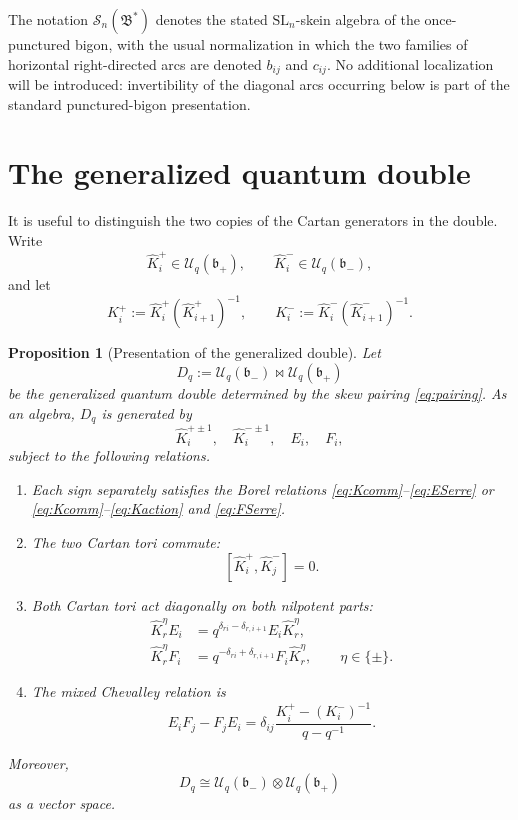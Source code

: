 \documentclass[11pt]{amsart}
\numberwithin{equation}{section}
\newtheorem{proposition}[equation]{Proposition}
\theoremstyle{definition}
\theoremstyle{remark}
\newcommand{\Uc}{\mathcal{U}}
\newcommand{\bcS}{\mathcal{S}}
\newcommand{\fB}{\mathfrak{B}}
\newcommand{\fb}{\mathfrak{b}}
\newcommand{\bipr}{\mathbin{\bowtie}}
\begin{document}
The notation \(\bcS_n(\fB^*)\) denotes the stated \(\mathrm{SL}_n\)-skein algebra
of the once-punctured bigon, with the usual normalization in which the two
families of horizontal right-directed arcs are denoted \(b_{ij}\) and \(c_{ij}\).
No additional localization will be introduced: invertibility of the diagonal
arcs occurring below is part of the standard punctured-bigon presentation.

\section{The generalized quantum double}

It is useful to distinguish the two copies of the Cartan generators in the
double.  Write
\[
\widehat K_i^{+}\in \Uc_q(\fb_+),
\qquad
\widehat K_i^{-}\in \Uc_q(\fb_-),
\]
and let
\[
K_i^{+}
 :=\widehat K_i^{+}(\widehat K_{i+1}^{+})^{-1},
\qquad
K_i^{-}
 :=\widehat K_i^{-}(\widehat K_{i+1}^{-})^{-1}.
\]

\begin{proposition}[Presentation of the generalized double]
\label{prop:double-presentation}
Let
\[
D_q:=\Uc_q(\fb_-)\bipr\Uc_q(\fb_+)
\]
be the generalized quantum double determined by the skew pairing
\eqref{eq:pairing}.  As an algebra, \(D_q\) is generated by
\[
\widehat K_i^{+\pm1},\quad
\widehat K_i^{-\pm1},\quad
E_i,\quad F_i,
\]
subject to the following relations.

\begin{enumerate}
\item Each sign separately satisfies the Borel relations
\eqref{eq:Kcomm}--\eqref{eq:ESerre} or
\eqref{eq:Kcomm}--\eqref{eq:Kaction} and \eqref{eq:FSerre}.

\item The two Cartan tori commute:
\begin{equation}\label{eq:D-Cartan-commute}
[\widehat K_i^{+},\widehat K_j^{-}]=0.
\end{equation}

\item Both Cartan tori act diagonally on both nilpotent parts:
\begin{align}
\widehat K_r^{\eta}E_i
 &=q^{\delta_{ri}-\delta_{r,i+1}}
   E_i\widehat K_r^{\eta},
 \label{eq:D-KE}\\
\widehat K_r^{\eta}F_i
 &=q^{-\delta_{ri}+\delta_{r,i+1}}
   F_i\widehat K_r^{\eta},
 \qquad \eta\in\{\pm\}.
 \label{eq:D-KF}
\end{align}

\item The mixed Chevalley relation is
\begin{equation}\label{eq:D-EF}
E_iF_j-F_jE_i
 =\delta_{ij}
 \frac{K_i^{+}-(K_i^{-})^{-1}}
      {q-q^{-1}}.
\end{equation}
\end{enumerate}

Moreover,
\begin{equation}\label{eq:D-factorization}
D_q\cong \Uc_q(\fb_-)\otimes \Uc_q(\fb_+)
\end{equation}
as a vector space.
\end{proposition}
\end{document}
